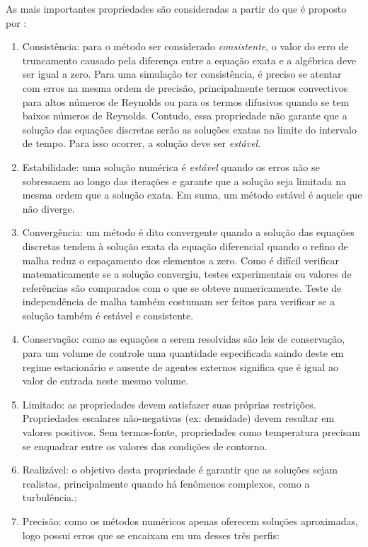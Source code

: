 As mais importantes propriedades são consideradas a partir do que é proposto por \citeauthor{Ferziger&Peric2020}:

\begin{enumerate}
    \item Consistência: para o método ser considerado \textit{consistente}, o valor do erro de truncamento causado pela diferença entre a equação exata e a algébrica deve ser igual a zero. Para uma simulação ter consistência, é preciso se atentar com erros na mesma ordem de precisão, principalmente termos convectivos para altos números de Reynolds ou para os termos difusivos quando se tem baixos números de Reynolds. Contudo, essa propriedade não garante que a solução das equações discretas serão as soluções exatas no limite do intervalo de tempo. Para isso ocorrer, a solução deve ser \textit{estável}.
    \item Estabilidade: uma solução numérica é \textit{estável} quando os erros não se sobressaem ao longo das iterações e garante que a solução seja limitada na mesma ordem que a solução exata. Em suma, um método estável é aquele que não diverge.
    \item Convergência: um método é dito convergente quando a solução das equações discretas tendem à solução exata da equação diferencial quando o refino de malha reduz o espaçamento dos elementos a zero. Como é difícil verificar matematicamente se a solução convergiu, testes experimentais ou valores de referências são comparados com o que se obteve numericamente. Teste de independência de malha também costumam ser feitos para verificar se a solução também é estável e consistente.
    \item Conservação: como as equações a serem resolvidas são leis de conservação, para um volume de controle uma quantidade especificada saindo deste em regime estacionário e ausente de agentes externos significa que é igual ao valor de entrada neste mesmo volume.
    \item Limitado: as propriedades devem satisfazer suas próprias restrições. Propriedades escalares não-negativas (ex: densidade) devem resultar em valores positivos. Sem termos-fonte, propriedades como temperatura precisam se enquadrar entre os valores das condições de contorno.
    \item Realizável: o objetivo desta propriedade é garantir que as soluções sejam realistas, principalmente quando há fenômenos complexos, como a turbulência.;
    \item Precisão: como os métodos numéricos apenas oferecem soluções aproximadas, logo possui erros que se encaixam em um desses três perfis:

\end{enumerate}

